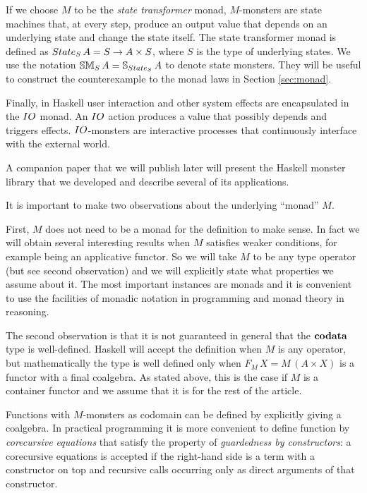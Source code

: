 If we choose $M$ to be the {\em state transformer} monad, $M$-monsters are state machines that, at every step, produce an output value that depends on an underlying state and change the state itself.
The state transformer monad is defined as $\state_S\,A = S\rightarrow A\times S$, where $S$ is the type of underlying states.
We use the notation $\stmon{S}\,A = \stream{\state_S}\,A$ to denote state monsters.
They will be useful to construct the counterexample to the monad laws in Section \ref{sec:monad}.

Finally, in Haskell user interaction and other system effects are encapsulated in the $\io$ monad. An $\io$ action produces a value that possibly depends and triggers effects. $\io$-monsters are interactive processes that continuously interface with the external world.

A companion paper that we will publish later will present the Haskell monster library that we developed and describe several of its applications.

It is important to make two observations about the underlying ``monad'' $M$.

First, $M$ does not need to be a monad for the definition to make sense. 
In fact we will obtain several interesting results when $M$ satisfies weaker conditions, for example being an applicative functor.
So we will take $M$ to be any type operator (but see second observation) and we will explicitly state what properties we assume about it.
The most important instances are monads and it is convenient to use the facilities of monadic notation in programming and monad theory in reasoning.

The second observation is that it is not guaranteed in general that the $\mathbf{codata}$ type is well-defined.
Haskell will accept the definition when $M$ is any operator, but mathematically the type is well defined only when $F_M\,X = M\,(A\times X)$ is a functor with a final coalgebra.
As stated above, this is the case if $M$ is a container functor and we assume that it is for the rest of the article.

Functions with $M$-monsters as codomain can be defined by explicitly giving a coalgebra.
In practical programming it is more convenient to define function by {\em corecursive equations} that satisfy the property of {\em guardedness by constructors}:
a corecursive equations is accepted if the right-hand side is a term with a constructor on top and recursive calls occurring only as direct arguments of that constructor.

